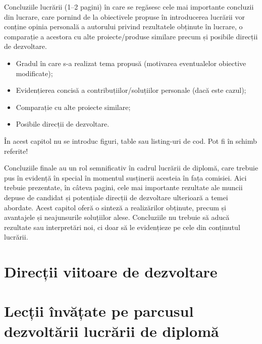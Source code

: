 
Concluziile lucrării (1–2 pagini) în care se regăsesc cele mai importante concluzii din lucrare, care pornind de la obiectivele propuse în introducerea lucrării vor conține opinia personală a autorului privind rezultatele obținute în lucrare, o comparație a acestora cu alte proiecte/produse similare precum și posibile direcții de dezvoltare. 

\begin{itemize}
    \item Gradul în care s-a realizat tema propusă (motivarea eventualelor obiective modificate);
    \item Evidențierea concisă a contribuțiilor/soluțiilor personale (dacă este cazul);
    \item Comparație cu alte proiecte similare;
    \item Posibile direcții de dezvoltare.
\end{itemize}

În acest capitol nu se introduc figuri, table sau listing-uri de cod. Pot fi în schimb referite!

Concluziile finale au un rol semnificativ în cadrul lucrării de diplomă, care trebuie pus în evidență în special în momentul susținerii acesteia în fața comisiei. Aici trebuie prezentate, în câteva pagini, cele mai importante rezultate ale muncii depuse de candidat și potențiale direcții de dezvoltare ulterioară a temei abordate. Acest capitol oferă o sinteză a realizărilor obținute, precum și avantajele și neajunsurile soluțiilor alese. Concluziile nu trebuie să aducă rezultate sau interpretări noi, ci doar să le evidențieze pe cele din conținutul lucrării.

\section*{Direcții viitoare de dezvoltare}

\textcolor{gray}{\lipsum[1-3]}

\section*{Lecții învățate pe parcusul dezvoltării lucrării de diplomă}

\textcolor{gray}{\lipsum[2-4]}